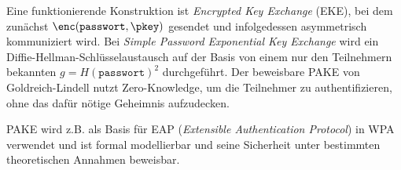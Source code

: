 Eine funktionierende Konstruktion ist \emph{Encrypted Key Exchange}
(EKE), bei dem zunächst $\enc(\mathtt{passwort},\pkey)$ gesendet und
infolgedessen asymmetrisch kommuniziert wird. Bei \emph{Simple Password
Exponential Key Exchange} wird ein Diffie-Hellman-Schlüsselaustausch auf
der Basis von einem nur den Teilnehmern bekannten $g =
H(\mathtt{passwort})^2$ durchgeführt. Der beweisbare PAKE von
Goldreich-Lindell nutzt Zero-Knowledge, um die Teilnehmer zu
authentifizieren, ohne das dafür nötige Geheimnis aufzudecken.

PAKE wird z.B. als Basis für EAP (\emph{Extensible Authentication
Protocol}) in WPA verwendet und ist formal modellierbar und seine
Sicherheit unter bestimmten theoretischen Annahmen beweisbar.
